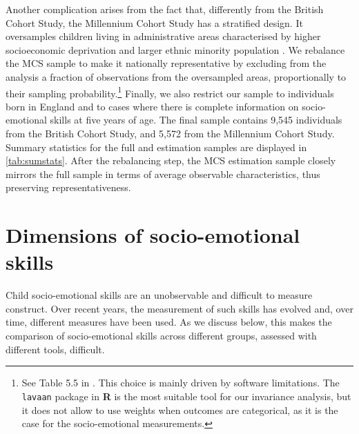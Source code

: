 Another complication arises from the fact that, differently from the British Cohort Study, the Millennium Cohort Study has a stratified design. It oversamples children living in administrative areas characterised by higher socioeconomic deprivation and larger ethnic minority population \citep{Plewis2007}. We rebalance the MCS sample to make it nationally representative by excluding from the analysis a fraction of observations from the oversampled areas, proportionally to their sampling probability.\footnote{See Table 5.5 in \citet{Plewis2007}. This choice is mainly driven by software limitations. The \texttt{lavaan} package in \textbf{\textsf{R}} \citep{Rosseel2012} is the most suitable tool for our invariance analysis, but it does not allow to use weights when outcomes are categorical, as it is the case for the socio-emotional measurements.} Finally, we also restrict our sample to individuals born in England and to cases where there is complete information on socio-emotional skills at five years of age. The final sample contains 9,545 individuals from the British Cohort Study, and 5,572 from the Millennium Cohort Study. Summary statistics for the full and estimation samples are displayed in \autoref{tab:sumstats}. After the rebalancing step, the MCS estimation sample closely mirrors the full sample in terms of average observable characteristics, thus preserving representativeness.

\section{Dimensions of  socio-emotional skills \label{sec:methods}}

Child socio-emotional skills are an unobservable and difficult to measure construct. Over recent years, the measurement of such skills has evolved and, over time, different measures have been used.  As we discuss below, this makes the comparison  of socio-emotional skills across different groups, assessed with different tools, difficult.

